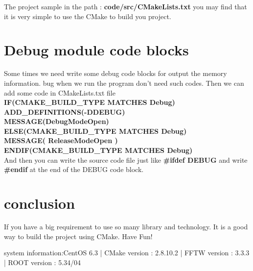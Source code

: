 \documentclass[fleqn,10pt]{SelfArx} %
\begin{document}
\begin{CJK*}{UTF8}{gbsn}
The project sample in the path : \textbf{code/src/CMakeLists.txt}
you may find that it is very simple to use the CMake to build you project.

\section{Debug module code blocks}

Some times we need write some debug code blocks for output the memory information.
bug when we run the program don't need such codes. 
Then we can add some code in CMakeLists.txt file\\
\textbf{IF(CMAKE\_BUILD\_TYPE MATCHES Debug)\\
    ADD\_DEFINITIONS(-DDEBUG)    \\
    MESSAGE(DebugModeOpen)\\
ELSE(CMAKE\_BUILD\_TYPE MATCHES Debug)\\
    MESSAGE( ReleaseModeOpen )\\
ENDIF(CMAKE\_BUILD\_TYPE MATCHES Debug)}\\
And then you can write the source code file just like \textbf{\#ifdef DEBUG} and write \textbf{\#endif} 
at the end of the DEBUG code block.


\section*{conclusion}

If you have a big requirement to use so many library and technology. It is a good way to build the project using CMake. Have Fun!

system information:CentOS 6.3 | CMake version : 2.8.10.2 | FFTW version : 3.3.3 | ROOT version : 5.34/04


\end{CJK*}
\end{document}
